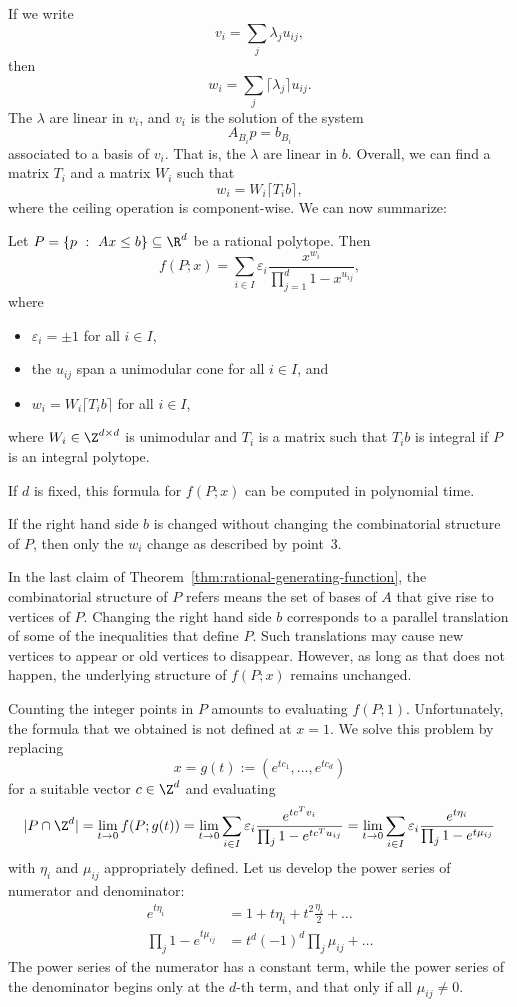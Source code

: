 If we write
\[
  v_i = \sum_j \lambda_j u_{ij},
\]
then
\[
  w_i = \sum_j \lceil \lambda_j \rceil u_{ij}.
\]
The $\lambda$ are linear in $v_i$,
and $v_i$ is the solution of the system
\[
  A_{B_i} p = b_{B_i}
\]
associated to a basis of $v_i$.
That is, the $\lambda$ are linear in $b$.
Overall, we can find a matrix $T_i$ and a matrix $W_i$ such that
\[
  w_i = W_i \lceil T_i b \rceil,
\]
where the ceiling operation is component-wise.
We can now summarize:

\begin{theorem}
  \label{thm:rational-generating-function}
  Let $P = \{ p ~:~ Ax \leq b \} \subseteq \R^d$ be a rational polytope.
  Then
  \[
    f(P;x) = \sum_{i \in I} \varepsilon_i \frac{x^{w_i}}{\prod_{j=1}^d 1 - x^{u_{ij}}},
  \]
  where
  \begin{itemize}
    \item $\varepsilon_i = \pm1$ for all $i \in I$,
    \item the $u_{ij}$ span a unimodular cone for all $i \in I$, and
    \item $w_i = W_i \lceil T_i b \rceil$ for all $i \in I$,
  \end{itemize}
  where $W_i \in \Z^{d \times d}$ is unimodular and $T_i$ is a matrix
  such that $T_i b$ is integral if $P$ is an integral polytope.

  If $d$ is fixed, this formula for $f(P;x)$ can be computed in polynomial time.

  If the right hand side $b$ is changed without changing the combinatorial structure of $P$,
  then only the $w_i$ change as described by point~3.
\end{theorem}

In the last claim of Theorem~\ref{thm:rational-generating-function},
the combinatorial structure of $P$ refers means the set of bases of $A$ that give rise to vertices of $P$.
Changing the right hand side $b$ corresponds to a parallel translation of some of the inequalities that define $P$.
Such translations may cause new vertices to appear or old vertices to disappear.
However, as long as that does not happen, the underlying structure of $f(P;x)$ remains unchanged.

Counting the integer points in $P$ amounts to evaluating $f(P;1)$.
Unfortunately, the formula that we obtained is not defined at $x = 1$.
We solve this problem by replacing
\[
  x = g(t) := (e^{tc_1}, \ldots, e^{tc_d})
\]
for a suitable vector $c \in \Z^d$ and evaluating
\[
  |P \cap \Z^d| = \lim_{t \to 0} f(P; g(t)) = \lim_{t \to 0} \sum_{i \in I} \varepsilon_i \frac{e^{t c^Tv_i}}{\prod_j 1 - e^{t c^T u_{ij}}}
    = \lim_{t \to 0} \sum_{i \in I} \varepsilon_i \frac{e^{t \eta_i}}{\prod_j 1 - e^{t \mu_{ij}}}
\]
with $\eta_i$ and $\mu_{ij}$ appropriately defined.
Let us develop the power series of numerator and denominator:
\begin{align*}
  e^{t \eta_i} &= 1 + t\eta_i + t^2 \frac{\eta_i}{2} + \dots \\
  \prod_j 1 - e^{t \mu_{ij}} &= t^d (-1)^d \prod_j \mu_{ij} + \dots
\end{align*}
The power series of the numerator has a constant term,
while the power series of the denominator begins only at the $d$-th term,
and that only if all $\mu_{ij} \neq 0$.

